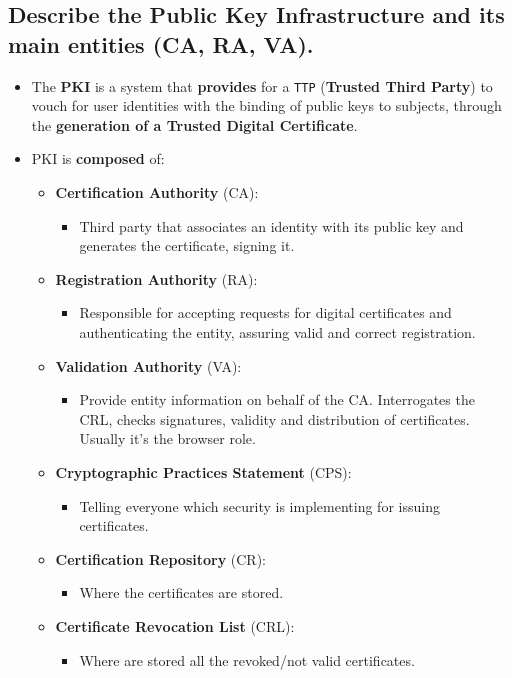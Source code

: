 \documentclass[9pt, letterpaper]{article}
\begin{document}
\subsection{Describe the Public Key Infrastructure and its main entities (CA, RA, VA).}
\begin{itemize}
	\item The \textbf{PKI} is a system that \textbf{provides} for a {\tt TTP} (\textbf{Trusted Third Party}) to vouch for user identities with the binding of public keys to subjects, through the \textbf{generation of a Trusted Digital Certificate}.
	\item PKI is \textbf{composed} of:
	      \begin{itemize}
		      \item \textbf{Certification Authority} (CA):
		            \begin{itemize}
			            \item Third party that associates an identity with its public key and generates the certificate, signing it.
		            \end{itemize}
		      \item \textbf{Registration Authority} (RA):
		            \begin{itemize}
			            \item Responsible for accepting requests for digital certificates and authenticating the entity, assuring valid and correct registration.
		            \end{itemize}
		      \item \textbf{Validation Authority} (VA):
		            \begin{itemize}
			            \item Provide entity information on behalf of the CA. Interrogates the CRL, checks signatures, validity and distribution of certificates. Usually it's the browser role.
		            \end{itemize}
		      \item \textbf{Cryptographic Practices Statement} (CPS):
		            \begin{itemize}
			            \item Telling everyone which security is implementing for issuing certificates.
		            \end{itemize}
		      \item \textbf{Certification Repository} (CR):
		            \begin{itemize}
			            \item Where the certificates are stored.
		            \end{itemize}
		      \item \textbf{Certificate Revocation List} (CRL):
		            \begin{itemize}
			            \item Where are stored all the revoked/not valid certificates.
		            \end{itemize}
	      \end{itemize}
\end{itemize}
\end{document}
